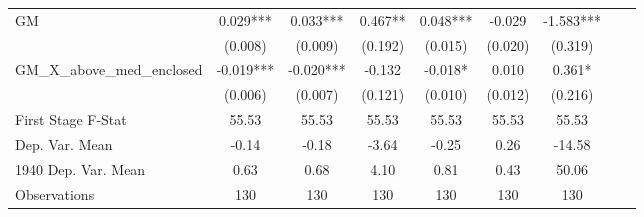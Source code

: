 \begin{tabular}{l*{8}{c}}
\cmidrule(lr){1-7}
GM              &    0.029***&    0.033***&    0.467** &    0.048***&   -0.029   &   -1.583***\\
                &  (0.008)   &  (0.009)   &  (0.192)   &  (0.015)   &  (0.020)   &  (0.319)   \\
\addlinespace
GM\_X\_above\_med\_enclosed&   -0.019***&   -0.020***&   -0.132   &   -0.018*  &    0.010   &    0.361*  \\
                &  (0.006)   &  (0.007)   &  (0.121)   &  (0.010)   &  (0.012)   &  (0.216)   \\
\midrule
First Stage F-Stat&    55.53   &    55.53   &    55.53   &    55.53   &    55.53   &    55.53   \\
Dep. Var. Mean  &    -0.14   &    -0.18   &    -3.64   &    -0.25   &     0.26   &   -14.58   \\
1940 Dep. Var. Mean&     0.63   &     0.68   &     4.10   &     0.81   &     0.43   &    50.06   \\
Observations    &      130   &      130   &      130   &      130   &      130   &      130   \\
       \bottomrule \end{tabular}
